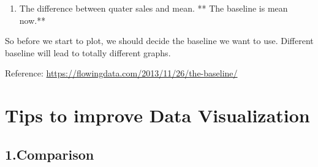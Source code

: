\documentclass[]{book}
\newenvironment{Shaded}{\begin{snugshade}}{\end{snugshade}}
\newcommand{\KeywordTok}[1]{\textcolor[rgb]{0.13,0.29,0.53}{\textbf{#1}}}
\newcommand{\DataTypeTok}[1]{\textcolor[rgb]{0.13,0.29,0.53}{#1}}
\newcommand{\DecValTok}[1]{\textcolor[rgb]{0.00,0.00,0.81}{#1}}
\newcommand{\StringTok}[1]{\textcolor[rgb]{0.31,0.60,0.02}{#1}}
\newcommand{\CommentTok}[1]{\textcolor[rgb]{0.56,0.35,0.01}{\textit{#1}}}
\newcommand{\OtherTok}[1]{\textcolor[rgb]{0.56,0.35,0.01}{#1}}
\newcommand{\ControlFlowTok}[1]{\textcolor[rgb]{0.13,0.29,0.53}{\textbf{#1}}}
\newcommand{\OperatorTok}[1]{\textcolor[rgb]{0.81,0.36,0.00}{\textbf{#1}}}
\newcommand{\NormalTok}[1]{#1}
\providecommand{\tightlist}{%
  \setlength{\itemsep}{0pt}\setlength{\parskip}{0pt}}
\theoremstyle{definition}
\theoremstyle{definition}
\theoremstyle{definition}
\theoremstyle{remark}
\begin{document}
\begin{enumerate}
\def\labelenumi{\arabic{enumi}.}
\setcounter{enumi}{4}
\tightlist
\item
  The difference between quater sales and mean. ** The baseline is mean
  now.**
\end{enumerate}

\begin{Shaded}
\end{Shaded}

So before we start to plot, we should decide the baseline we want to
use. Different baseline will lead to totally different graphs.

Reference: \url{https://flowingdata.com/2013/11/26/the-baseline/}

\section{Tips to improve Data
Visualization}\label{tips-to-improve-data-visualization}

\subsection{1.Comparison}\label{comparison}
\end{document}
